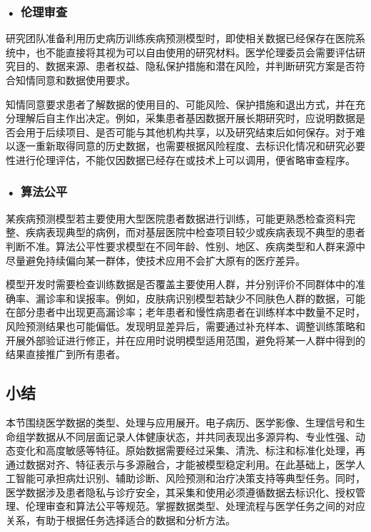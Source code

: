 \subsubsection*{\textbf{• 伦理审查}}

研究团队准备利用历史病历训练疾病预测模型时，即使相关数据已经保存在医院系统中，也不能直接将其视为可以自由使用的研究材料。医学伦理委员会需要评估研究目的、数据来源、患者权益、隐私保护措施和潜在风险，并判断研究方案是否符合知情同意和数据使用要求。

知情同意要求患者了解数据的使用目的、可能风险、保护措施和退出方式，并在充分理解后自主作出决定。例如，采集患者基因数据开展长期研究时，应说明数据是否会用于后续项目、是否可能与其他机构共享，以及研究结束后如何保存。对于难以逐一重新取得同意的历史数据，也需要根据风险程度、去标识化情况和研究必要性进行伦理评估，不能仅因数据已经存在或技术上可以调用，便省略审查程序。

\subsubsection*{\textbf{• 算法公平}}

某疾病预测模型若主要使用大型医院患者数据进行训练，可能更熟悉检查资料完整、疾病表现典型的病例，而对基层医院中检查项目较少或疾病表现不典型的患者判断不准。算法公平性要求模型在不同年龄、性别、地区、疾病类型和人群来源中尽量避免持续偏向某一群体，使技术应用不会扩大原有的医疗差异。

模型开发时需要检查训练数据是否覆盖主要使用人群，并分别评价不同群体中的准确率、漏诊率和误报率。例如，皮肤病识别模型若缺少不同肤色人群的数据，可能在部分患者中出现更高漏诊率；老年患者和慢性病患者在训练样本中数量不足时，风险预测结果也可能偏低。发现明显差异后，需要通过补充样本、调整训练策略和开展外部验证进行修正，并在应用时说明模型适用范围，避免将某一人群中得到的结果直接推广到所有患者。

\subsection*{小结}

本节围绕医学数据的类型、处理与应用展开。电子病历、医学影像、生理信号和生命组学数据从不同层面记录人体健康状态，并共同表现出多源异构、专业性强、动态变化和高度敏感等特征。原始数据需要经过采集、清洗、标注和标准化处理，再通过数据对齐、特征表示与多源融合，才能被模型稳定利用。在此基础上，医学人工智能可承担病灶识别、辅助诊断、风险预测和治疗决策支持等典型任务。同时，医学数据涉及患者隐私与诊疗安全，其采集和使用必须遵循数据去标识化、授权管理、伦理审查和算法公平等规范。掌握数据类型、处理流程与医学任务之间的对应关系，有助于根据任务选择适合的数据和分析方法。

